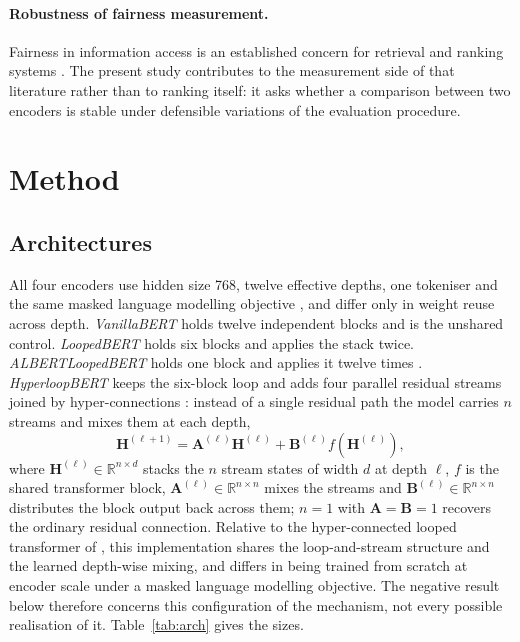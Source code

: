 \documentclass[sigconf,natbib=true,anonymous=true]{acmart}
\begin{document}
\paragraph{Robustness of fairness measurement.}
Fairness in information access is an established concern for retrieval and
ranking systems \citep{ekstrand2022fairness,singh2018fairness}. The present study
contributes to the measurement side of that literature rather than to ranking
itself: it asks whether a comparison between two encoders is stable under
defensible variations of the evaluation procedure.

\section{Method}
\label{sec:method}

\subsection{Architectures}

All four encoders use hidden size 768, twelve effective depths, one tokeniser and
the same masked language modelling objective \citep{devlin2019bert}, and differ
only in weight reuse across depth. \emph{VanillaBERT} holds twelve independent
blocks and is the unshared control. \emph{LoopedBERT} holds six blocks and
applies the stack twice. \emph{ALBERTLoopedBERT} holds one block and applies it
twelve times \citep{lan2020albert}. \emph{HyperloopBERT} keeps the six-block loop
and adds four parallel residual streams joined by hyper-connections
\citep{zhu2025hyperconnections}: instead of a single residual path the model
carries $n$ streams and mixes them at each depth,
%
\begin{equation}
\mathbf{H}^{(\ell+1)} = \mathbf{A}^{(\ell)}\mathbf{H}^{(\ell)}
                      + \mathbf{B}^{(\ell)} f\!\left(\mathbf{H}^{(\ell)}\right),
\end{equation}
%
where $\mathbf{H}^{(\ell)} \in \mathbb{R}^{n \times d}$ stacks the $n$ stream
states of width $d$ at depth $\ell$, $f$ is the shared transformer block,
$\mathbf{A}^{(\ell)} \in \mathbb{R}^{n \times n}$ mixes the streams and
$\mathbf{B}^{(\ell)} \in \mathbb{R}^{n \times n}$ distributes the block output
back across them; $n=1$ with $\mathbf{A}=\mathbf{B}=1$ recovers the ordinary
residual connection. Relative to the hyper-connected looped transformer of
\citet{zeitoun2026hyperloop}, this implementation shares the loop-and-stream
structure and the learned depth-wise mixing, and differs in being trained from
scratch at encoder scale under a masked language modelling objective. The
negative result below therefore concerns this configuration of the mechanism, not
every possible realisation of it. Table~\ref{tab:arch} gives the sizes.
\end{document}
